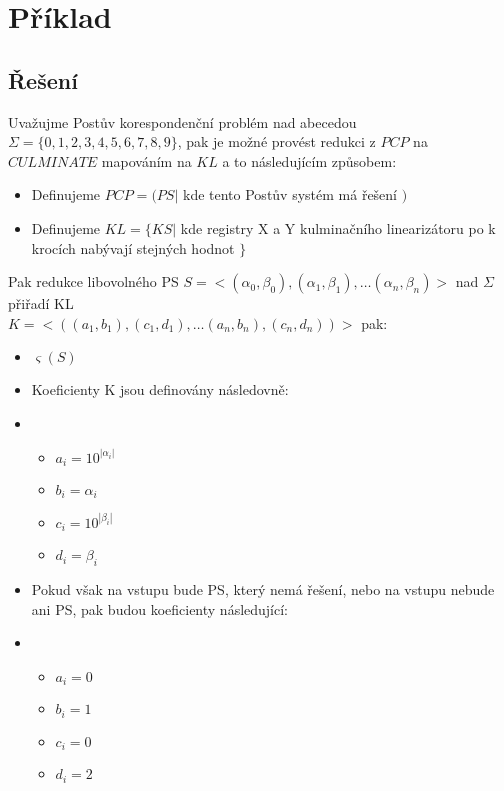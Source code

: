 \documentclass[11pt, a4paper]{article}
\begin{document}
\clearpage
\maketitle
\section{Příklad}
\subsection*{Řešení}
Uvažujme Postův korespondenční problém nad abecedou $\Sigma = \{0, 1, 2, 3, 4, 5, 6, 7, 8, 9\}$, pak je možné provést redukci z $PCP$ na $CULMINATE$ mapováním na $KL$ a to následujícím způsobem:

\begin{itemize}[label={},noitemsep]
	\item Definujeme $PCP = (PS | $ kde tento Postův systém má řešení $)$
	\item Definujeme $KL = \{KS | $ kde registry X a Y kulminačního linearizátoru po k krocích nabývají stejných hodnot $\}$
\end{itemize}

\noindent Pak redukce libovolného PS $S =<(\alpha_0, \beta_0), (\alpha_1, \beta_1), \dots (\alpha_n, \beta_n)>$ nad $\Sigma$ přiřadí KL \\$K = <((a_1, b_1), (c_1, d_1), \dots (a_n, b_n), (c_n, d_n))>$ pak:

\begin{itemize}[label={},noitemsep]
	\item $\varsigma(S)$
	\item Koeficienty K jsou definovány následovně:
	\item \begin{itemize}[label={},noitemsep]
	\item $a_i = 10^{|\alpha_i|}$
	\item $b_i = \alpha_i$
	\item $c_i = 10^{|\beta_i|}$
	\item $d_i = \beta_i$
\end{itemize}
\item Pokud však na vstupu bude PS, který nemá řešení, nebo na vstupu nebude ani PS, pak budou koeficienty následující:
\item \begin{itemize}[label={},noitemsep]
\item $a_i = 0$
\item $b_i = 1$
\item $c_i = 0$
\item $d_i = 2$
\end{itemize}
\end{itemize}
\end{document}
